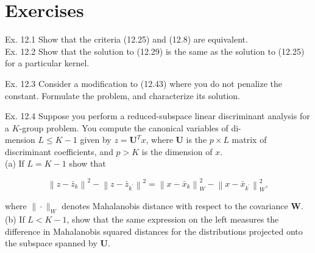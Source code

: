 \documentclass[10pt]{article}
\begin{document}
\section*{Exercises}
Ex. 12.1 Show that the criteria (12.25) and (12.8) are equivalent.\\
Ex. 12.2 Show that the solution to (12.29) is the same as the solution to (12.25) for a particular kernel.

Ex. 12.3 Consider a modification to (12.43) where you do not penalize the constant. Formulate the problem, and characterize its solution.

Ex. 12.4 Suppose you perform a reduced-subspace linear discriminant analysis for a $K$-group problem. You compute the canonical variables of di-\\
mension $L \leq K-1$ given by $z=\mathbf{U}^{T} x$, where $\mathbf{U}$ is the $p \times L$ matrix of discriminant coefficients, and $p>K$ is the dimension of $x$.\\
(a) If $L=K-1$ show that

$$
\left\|z-\bar{z}_{k}\right\|^{2}-\left\|z-\bar{z}_{k^{\prime}}\right\|^{2}=\left\|x-\bar{x}_{k}\right\|_{W}^{2}-\left\|x-\bar{x}_{k^{\prime}}\right\|_{W}^{2},
$$

where $\|\cdot\|_{W}$ denotes Mahalanobis distance with respect to the covariance $\mathbf{W}$.\\
(b) If $L<K-1$, show that the same expression on the left measures the difference in Mahalanobis squared distances for the distributions projected onto the subspace spanned by $\mathbf{U}$.
\end{document}
